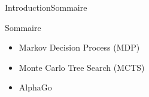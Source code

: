 \begin{frame}{Introduction}{Sommaire}
	\begin{center}
		\begin{block}{Sommaire}
			\begin{itemize}[label=\textbullet, font=\LARGE \color{black}]
				\item Markov Decision Process (MDP)
				\item Monte Carlo Tree Search (MCTS)
				\item AlphaGo
			\end{itemize}
		\end{block}
	\end{center}
\end{frame}